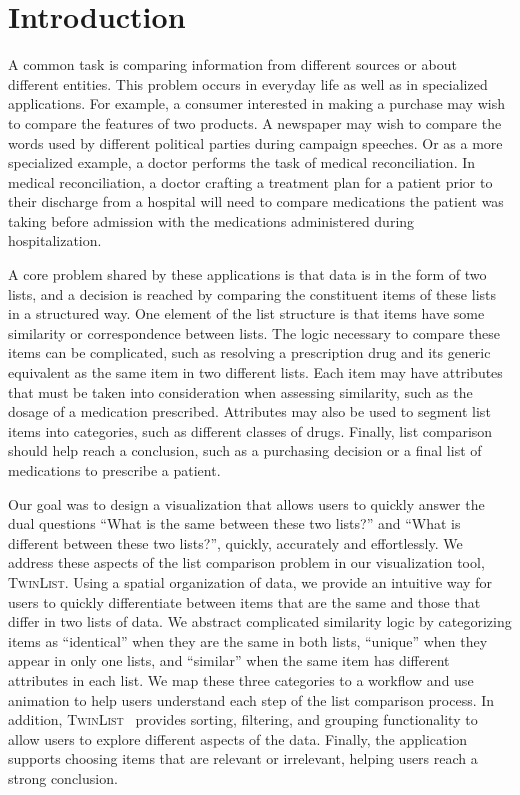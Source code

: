 \documentclass{chi2009}
\newcommand{\TwinList}{\textsc{TwinList}}
\begin{document}


\section{Introduction}
A common task is comparing information from different sources or about different entities. This problem occurs in everyday life as well as in specialized applications. For example, a consumer interested in making a purchase may wish to compare the features of two products. A newspaper may wish to compare the words used by different political parties during campaign speeches. Or as a more specialized example, a doctor performs the task of medical reconciliation. In medical reconciliation, a doctor crafting a treatment plan for a patient prior to their discharge from a hospital will need to compare medications the patient was taking before admission with the medications administered during hospitalization. 

A core problem shared by these applications is that data is in the form of two lists, and a decision is reached by comparing the constituent items of these lists in a structured way. One element of the list structure is that items have some similarity or correspondence between lists. The logic necessary to compare these items can be complicated, such as resolving a prescription drug and its generic equivalent as the same item in two different lists. Each item may have attributes that must be taken into consideration when assessing similarity, such as the dosage of a medication prescribed. Attributes may also be used to segment list items into categories, such as different classes of drugs. Finally, list comparison should help reach a conclusion, such as a purchasing decision or a final list of medications to prescribe a patient.

Our goal was to design a visualization that allows users to quickly answer the dual questions ``What is the same between these two lists?'' and ``What is different between these two lists?'', quickly, accurately and effortlessly. We address these aspects of the list comparison problem in our visualization tool, \TwinList. Using a spatial organization of data, we provide an intuitive way for users to quickly differentiate between items that are the same and those that differ in two lists of data. We abstract complicated similarity logic by categorizing items as ``identical'' when they are the same in both lists, ``unique'' when they appear in only one lists, and ``similar'' when the same item has different attributes in each list. We map these three categories to a workflow and use animation to help users understand each step of the list comparison process. In addition, \TwinList~ provides sorting, filtering, and grouping functionality to allow users to explore different aspects of the data. Finally, the application supports choosing items that are relevant or irrelevant, helping users reach a strong conclusion. 
\end{document}
